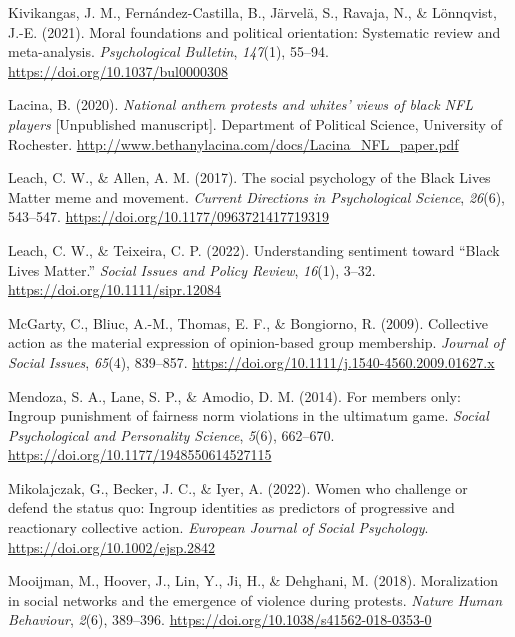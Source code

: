 \documentclass[12pt, letterpaper]{article}
\newenvironment{CSLReferences}[2]{}{}
\begin{document}
\begin{CSLReferences}{1}{0}
\leavevmode{}%
Kivikangas, J. M., Fernández-Castilla, B., Järvelä, S., Ravaja, N., \&
Lönnqvist, J.-E. (2021). Moral foundations and political orientation:
{Systematic} review and meta-analysis. \emph{Psychological Bulletin},
\emph{147}(1), 55--94. \url{https://doi.org/10.1037/bul0000308}

\leavevmode{}%
Lacina, B. (2020). \emph{National anthem protests and whites' views of
black NFL players} {[}Unpublished manuscript{]}. Department of Political
Science, University of Rochester.
\url{http://www.bethanylacina.com/docs/Lacina_NFL_paper.pdf}

\leavevmode{}%
Leach, C. W., \& Allen, A. M. (2017). The social psychology of the
{Black Lives Matter} meme and movement. \emph{Current Directions in
Psychological Science}, \emph{26}(6), 543--547.
\url{https://doi.org/10.1177/0963721417719319}

\leavevmode{}%
Leach, C. W., \& Teixeira, C. P. (2022). Understanding sentiment toward
{``{Black Lives Matter}.''} \emph{Social Issues and Policy Review},
\emph{16}(1), 3--32. \url{https://doi.org/10.1111/sipr.12084}

\leavevmode{}%
McGarty, C., Bliuc, A.-M., Thomas, E. F., \& Bongiorno, R. (2009).
Collective action as the material expression of opinion-based group
membership. \emph{Journal of Social Issues}, \emph{65}(4), 839--857.
\url{https://doi.org/10.1111/j.1540-4560.2009.01627.x}

\leavevmode{}%
Mendoza, S. A., Lane, S. P., \& Amodio, D. M. (2014). For members only:
Ingroup punishment of fairness norm violations in the ultimatum game.
\emph{Social Psychological and Personality Science}, \emph{5}(6),
662--670. \url{https://doi.org/10.1177/1948550614527115}

\leavevmode{}%
Mikolajczak, G., Becker, J. C., \& Iyer, A. (2022). Women who challenge
or defend the status quo: {Ingroup} identities as predictors of
progressive and reactionary collective action. \emph{European Journal of
Social Psychology}. \url{https://doi.org/10.1002/ejsp.2842}

\leavevmode{}%
Mooijman, M., Hoover, J., Lin, Y., Ji, H., \& Dehghani, M. (2018).
Moralization in social networks and the emergence of violence during
protests. \emph{Nature Human Behaviour}, \emph{2}(6), 389--396.
\url{https://doi.org/10.1038/s41562-018-0353-0}


\end{CSLReferences}
\end{document}
